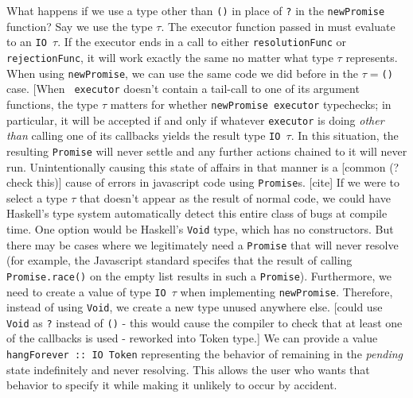 \documentclass[12pt, english, letterpaper]{kuthesis}
\newcommand{\lit}[1]{\texttt{#1}}
\begin{document}
What happens if we use a type other than \lit{()} in place of \lit ? in the \lit{newPromise} function?  Say we use the type $\tau$.  The executor function passed in must evaluate to an \lit{IO $\tau$}.  If the executor ends in a call to either \lit{resolutionFunc} or \lit{rejectionFunc}, it will work exactly the same no matter what type $\tau$ represents.  When using \lit{newPromise}, we can use the same code we did before in the \lit{$\tau = $()} case.  [When \lit{ executor} doesn't contain a tail-call to one of its argument functions, the type $\tau$ matters for whether \lit{newPromise executor} typechecks; in particular, it will be accepted if and only if whatever \lit{executor} is doing \emph{other than} calling one of its callbacks yields the result type \lit{IO $\tau$}. In this situation, the resulting \lit{Promise} will never settle and any further actions chained to it will never run.  Unintentionally causing this state of affairs in that manner is a [common (?check this)] cause of errors in javascript code using \lit{Promise}s. [cite]  If we were to select a type $\tau$ that doesn't appear as the result of normal code, we could have Haskell's type system automatically detect this entire class of bugs at compile time.  One option would be Haskell's \lit{Void} type, which has no constructors.  But there may be cases where we legitimately need a \lit{Promise} that will never resolve (for example, the Javascript standard specifes that the result of calling \lit{Promise.race()} on the empty list results in such a \lit{Promise}).  Furthermore, we need to create a value of type \lit{IO $\tau$} when implementing \lit{newPromise}.  Therefore, instead of using \lit{Void}, we create a new type unused anywhere else.  [could use \lit{Void} as \lit ? instead of \lit{()} - this would cause the compiler to check that at least one of the callbacks is used - reworked into Token type.]  We can provide a value \lit{hangForever :: IO Token} representing the behavior of remaining in the \emph{pending} state indefinitely and never resolving.  This allows the user who wants that behavior to specify it while making it unlikely to occur by accident.
\end{document}
